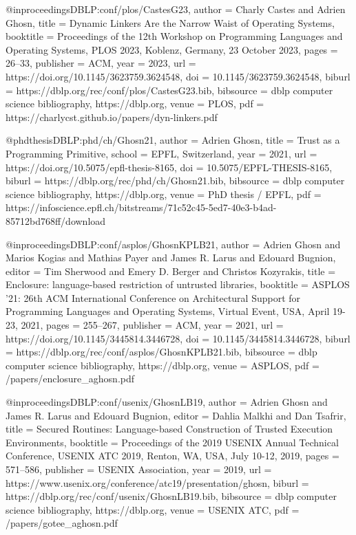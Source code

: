 @inproceedings{DBLP:conf/plos/CastesG23,
  author = {Charly Castes and Adrien Ghosn},
  title = {Dynamic Linkers Are the Narrow Waist of Operating Systems},
  booktitle = {Proceedings of the 12th Workshop on Programming Languages and Operating Systems, PLOS 2023, Koblenz, Germany, 23 October 2023},
  pages = {26--33},
  publisher = {ACM},
  year = {2023},
  url = {https://doi.org/10.1145/3623759.3624548},
  doi = {10.1145/3623759.3624548},
  biburl = {https://dblp.org/rec/conf/plos/CastesG23.bib},
  bibsource = {dblp computer science bibliography, https://dblp.org},
  venue = {PLOS},
  pdf = {https://charlycst.github.io/papers/dyn-linkers.pdf}
}

@phdthesis{DBLP:phd/ch/Ghosn21,
  author = {Adrien Ghosn},
  title = {Trust as a Programming Primitive},
  school = {EPFL, Switzerland},
  year = {2021},
  url = {https://doi.org/10.5075/epfl-thesis-8165},
  doi = {10.5075/EPFL-THESIS-8165},
  biburl = {https://dblp.org/rec/phd/ch/Ghosn21.bib},
  bibsource = {dblp computer science bibliography, https://dblp.org},
  venue = {PhD thesis / EPFL},
  pdf = {https://infoscience.epfl.ch/bitstreams/71c52c45-5ed7-40e3-b4ad-85712bd768ff/download}
}

@inproceedings{DBLP:conf/asplos/GhosnKPLB21,
  author = {Adrien Ghosn and Marios Kogias and Mathias Payer and James R. Larus and Edouard Bugnion},
  editor = {Tim Sherwood and Emery D. Berger and Christos Kozyrakis},
  title = {Enclosure: language-based restriction of untrusted libraries},
  booktitle = {ASPLOS '21: 26th ACM International Conference on Architectural Support for Programming Languages and Operating Systems, Virtual Event, USA, April 19-23, 2021},
  pages = {255--267},
  publisher = {ACM},
  year = {2021},
  url = {https://doi.org/10.1145/3445814.3446728},
  doi = {10.1145/3445814.3446728},
  biburl = {https://dblp.org/rec/conf/asplos/GhosnKPLB21.bib},
  bibsource = {dblp computer science bibliography, https://dblp.org},
  venue = {ASPLOS},
  pdf = {/papers/enclosure_aghosn.pdf}
}

@inproceedings{DBLP:conf/usenix/GhosnLB19,
  author = {Adrien Ghosn and James R. Larus and Edouard Bugnion},
  editor = {Dahlia Malkhi and Dan Tsafrir},
  title = {Secured Routines: Language-based Construction of Trusted Execution Environments},
  booktitle = {Proceedings of the 2019 USENIX Annual Technical Conference, USENIX ATC 2019, Renton, WA, USA, July 10-12, 2019},
  pages = {571--586},
  publisher = {USENIX Association},
  year = {2019},
  url = {https://www.usenix.org/conference/atc19/presentation/ghosn},
  biburl = {https://dblp.org/rec/conf/usenix/GhosnLB19.bib},
  bibsource = {dblp computer science bibliography, https://dblp.org},
  venue = {USENIX ATC},
  pdf = {/papers/gotee_aghosn.pdf}
}

